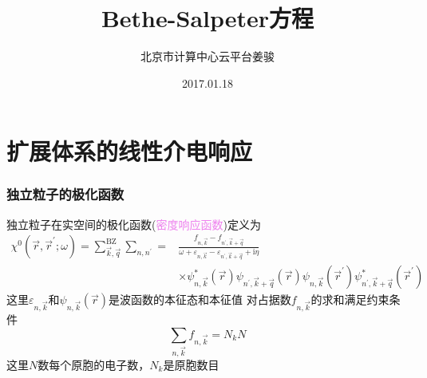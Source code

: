\documentclass[cjk,slidestop,compress,mathserif,blue]{beamer}
\begin{document}

\title{Bethe-Salpeter方程}

\author{北京市计算中心\;云平台\:姜骏}
\date{\textrm{2017.01.18}}
\frame{\titlepage}

\section*{}

\small
\section{扩展体系的线性介电响应}
\frame
{
	\frametitle{独立粒子的极化函数}
	独立粒子在实空间的极化函数(\textcolor{violet}{密度响应函数})定义为
	\begin{displaymath}
		\begin{aligned}
			\chi^0(\vec r,\vec r^{\prime};\omega)=\sum_{\vec k,\vec q}^{\mathrm{BZ}}\sum_{n,n^{\prime}}=&\frac{f_{n,\vec k}-f_{n^{\prime},\vec k+\vec q}}{\omega+\varepsilon_{n,\vec k}-\varepsilon_{n^{\prime},\vec k+\vec q}+\mathrm{i}\eta}\\
			&\times\psi_{n,\vec k}^{\ast}(\vec r)\psi_{n^{\prime},\vec k+\vec q}(\vec r)\psi_{n,\vec k}(\vec r^{\prime})\psi_{n^{\prime},\vec k+\vec q}^{\ast}(\vec r^{\prime})
		\end{aligned}
	\end{displaymath}
	这里$\varepsilon_{n,\vec k}$和$\psi_{n,\vec k}(\vec r)$是波函数的本征态和本征值
	\vskip 5pt
	对占据数$f_{n,\vec k}$的求和满足约束条件
	\begin{displaymath}
		\sum_{n,\vec k}f_{n,\vec k}=N_kN
	\end{displaymath}
	这里$N$数每个原胞的电子数，$N_k$是原胞数目
}
\end{document}
